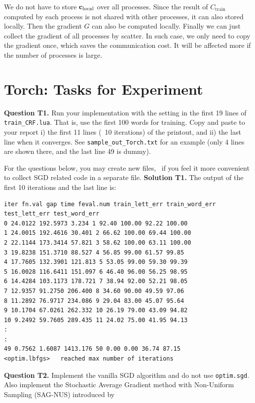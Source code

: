 \documentclass[11pt]{report}
\begin{document}
We do not have to store $\mathbf{\boldsymbol{c}}_{\text{local}}$ over all processes. Since the result of $C_{\text{train}}$ computed by each process is not shared with other processes, it can also stored locally. Then the gradient $G$ can also be computed locally. Finally we can just collect the gradient of all processes by scatter. In such case, we only need to copy the gradient once, which saves the communication cost. It will be affected more if the number of processes is large.

\section{Torch: Tasks for Experiment}

{\bf Question T1.}
Run your implementation with the setting in the first 19 lines of \verb!train_CRF.lua!.
That is, use the first 100 words for training.
Copy and paste to your report
i) the first 11 lines (\ie\ 10 iterations) of the printout,
and
ii) the last line when it converges.
%
See \verb!sample_out_Torch.txt! for an example (only 4 lines are shown there, and the last line 49 is dummy).


For the questions below, you may create new files,
\eg\ if you feel it more convenient to collect SGD related code in a separate file.
{\bf Solution T1.}
The output of the first 10 iterations and the last line is: 

\vspace{-1em}
\begin{verbatim}
iter fn.val gap time feval.num train_lett_err train_word_err test_lett_err test_word_err
0 24.0122 192.5973 3.234 1 92.40 100.00 92.22 100.00
1 24.0015 192.4616 30.401 2 66.62 100.00 69.44 100.00
2 22.1144 173.3414 57.821 3 58.62 100.00 63.11 100.00
3 19.8238 151.3710 88.527 4 56.85 99.00 61.57 99.85
4 17.7605 132.3901 121.813 5 53.05 99.00 59.30 99.39
5 16.0028 116.6411 151.097 6 46.40 96.00 56.25 98.95
6 14.4284 103.1173 178.721 7 38.94 92.00 52.21 98.05
7 12.9357 91.2750 206.400 8 34.60 90.00 49.59 97.06
8 11.2892 76.9717 234.086 9 29.04 83.00 45.07 95.64
9 10.1704 67.0261 262.332 10 26.19 79.00 43.09 94.82
10 9.2492 59.7605 289.435 11 24.02 75.00 41.95 94.13
:
:
49 0.7562 1.6087 1413.176 50 0.00 0.00 36.74 87.15
<optim.lbfgs> 	reached max number of iterations
\end{verbatim}

{\bf Question T2.}
Implement the vanilla SGD algorithm and do not use \verb!optim.sgd!.
Also implement the Stochastic Average Gradient method with Non-Uniform Sampling (SAG-NUS) introduced by
\vspace{0.5em}
\end{document}
